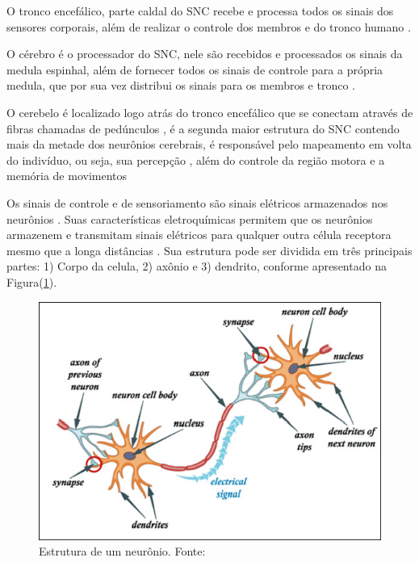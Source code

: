 O tronco encefálico, parte caldal do SNC recebe e processa todos os sinais dos sensores corporais, além de realizar o controle dos membros e do tronco humano \cite{KANDEL}.

O cérebro é o processador do SNC, nele são recebidos e processados os sinais da medula espinhal, além de fornecer todos os sinais de controle para a própria medula, que por sua vez distribui os sinais para os membros e tronco \cite{KANDEL}.

O cerebelo é localizado logo atrás do tronco encefálico que se conectam através de fibras chamadas de pedúnculos \cite{KANDEL}, é a segunda maior estrutura do SNC contendo mais da metade dos neurônios cerebrais, \cite{SIULYDissertacao} é responsável pelo mapeamento em volta do indivíduo, ou seja, sua percepção \cite{alvarezneurobiomecanismos}, além do controle da região motora e a memória de movimentos \cite{SIULYDissertacao,alvarezneurobiomecanismos}

Os sinais de controle e de sensoriamento são sinais elétricos armazenados nos neurônios \cite{KANDEL}. Suas características eletroquímicas permitem que os neurônios armazenem e transmitam sinais elétricos para qualquer outra célula receptora mesmo que a longa distâncias \cite{SIULYDissertacao}. Sua estrutura pode ser dividida em três principais partes: 1) Corpo da celula, 2) axônio e 3) dendrito, conforme apresentado na Figura(\ref{neuronParts}).
\begin{figure}[h]
	\centering
	\includegraphics[keepaspectratio=true,scale=1.0]{figuras/Estrutura_neuronio.PNG}
	\caption{Estrutura de um neurônio. Fonte: \cite{SIULYDissertacao}}
	\label{neuronParts}
\end{figure}

